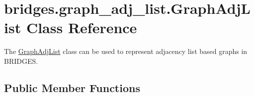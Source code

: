 \hypertarget{classbridges_1_1graph__adj__list_1_1_graph_adj_list}{}\section{bridges.\+graph\+\_\+adj\+\_\+list.\+Graph\+Adj\+List Class Reference}
\label{classbridges_1_1graph__adj__list_1_1_graph_adj_list}


The \mbox{\hyperlink{classbridges_1_1graph__adj__list_1_1_graph_adj_list}{Graph\+Adj\+List}} class can be used to represent adjacency list based graphs in B\+R\+I\+D\+G\+ES.  


\subsection*{Public Member Functions}
